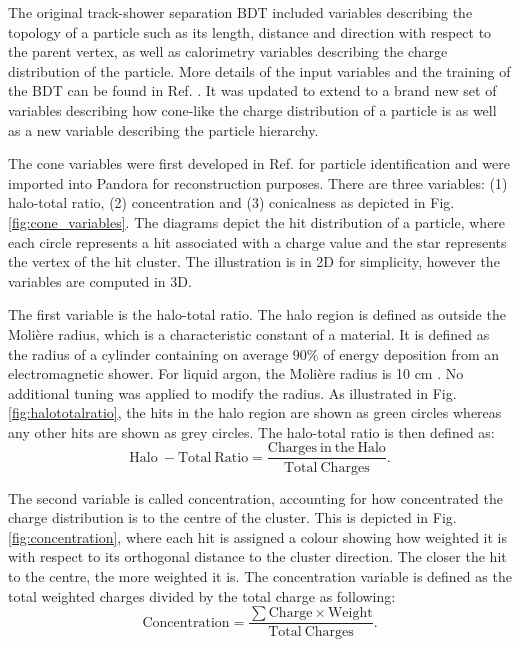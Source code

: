 The original track-shower separation BDT included variables describing the topology of a particle such as its length, distance and direction with respect to the parent vertex, as well as calorimetry variables describing the charge distribution of the particle.
More details of the input variables and the training of the BDT can be found in Ref. \cite{EdPhD}.
It was updated to extend to a brand new set of variables describing how cone-like the charge distribution of a particle is as well as a new variable describing the particle hierarchy.

The cone variables were first developed in Ref. \cite{warwick_pid} for particle identification and were imported into Pandora for reconstruction purposes.
There are three variables: (1) halo-total ratio, (2) concentration and (3) conicalness as depicted in Fig. \ref{fig:cone_variables}.
The diagrams depict the hit distribution of a particle, where each circle represents a hit associated with a charge value and the star represents the vertex of the hit cluster.
The illustration is in 2D for simplicity, however the variables are computed in 3D.

The first variable is the halo-total ratio.
The halo region is defined as outside the Molière radius, which is a characteristic constant of a material.
It is defined as the radius of a cylinder containing on average 90\% of energy deposition from an electromagnetic shower.
For liquid argon, the Molière radius is 10 cm \cite{Passage}.
No additional tuning was applied to modify the radius.
As illustrated in Fig. \ref{fig:halototalratio}, the hits in the halo region are shown as green circles whereas any other hits are shown as grey circles.
The halo-total ratio is then defined as:
\begin{equation}
	\mathrm{Halo\ - Total\ Ratio = \frac{Charges\ in\ the\ Halo}{Total\ Charges}}.
\end{equation}

The second variable is called concentration, accounting for how concentrated the charge distribution is to the centre of the cluster.
This is depicted in Fig. \ref{fig:concentration}, where each hit is assigned a colour showing how weighted it is with respect to its orthogonal distance to the cluster direction.
The closer the hit to the centre, the more weighted it is.
The concentration variable is defined as the total weighted charges divided by the total charge as following:
\begin{equation}
	\mathrm{Concentration = \frac{\sum Charge \times Weight}{Total\ Charges}}.
\end{equation}

